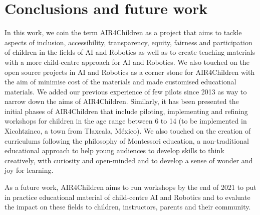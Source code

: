 \documentclass[sigconf]{acmart}
\begin{document}

\section{Conclusions and future work}
In this work, we coin the term AIR4Children as a project that aims to tackle aspects of inclusion, accessibility, transparency, equity, fairness and participation of children in the fields of AI and Robotics as well as to create teaching materials with a more child-centre approach for AI and Robotics.
We also touched on the open source projects in AI and Robotics as a corner stone for AIR4Children with the aim of minimise cost of the materials and made customised educational materials.  
We added our previous experience of few pilots since 2013 as way to narrow down the aims of AIR4Children.
Similarly, it has been presented the initial phases of AIR4Children that include piloting, implementing and refining workshops for children in the age range between 6 to 14 (to be implemented in Xicohtzinco, a town from Tlaxcala, M\'exico).
We also touched on the creation of curriculums following the philosophy of Montessori education, a non-traditional educational approach to help young audiences to develop skills to think creatively, with curiosity and open-minded and to develop a sense of wonder and joy for learning.

As a future work, AIR4Children aims to run workshops by the end of 2021 to put in practice educational material of child-centre AI and Robotics and to evaluate the impact on these fields to children, instructors, parents and their community. 

\end{document}
